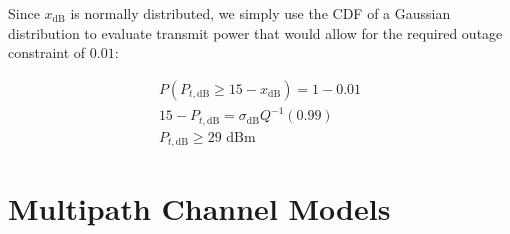 \documentclass[12pt]{report} %
\begin{document}
Since $x_{\text{dB}}$ is normally distributed, we simply use the CDF of a Gaussian distribution to evaluate transmit power that would allow for the required outage constraint of $0.01$:

\begin{align}
  P(P_{t,\text{dB}} \geq  15 - x_{\text{dB}}) = 1 - 0.01 \nonumber \\
  15 - P_{t,\text{dB}} = \sigma_{\text{dB}}Q^{-1}(0.99) \nonumber  \\
  P_{t,\text{dB}} \geq 29 \text{ dBm} \nonumber
\end{align}

\chapter{Multipath Channel Models}

\glsaddall
\printglossary[type=\acronymtype,title=Acronyms]

% 
% 
\end{document}
